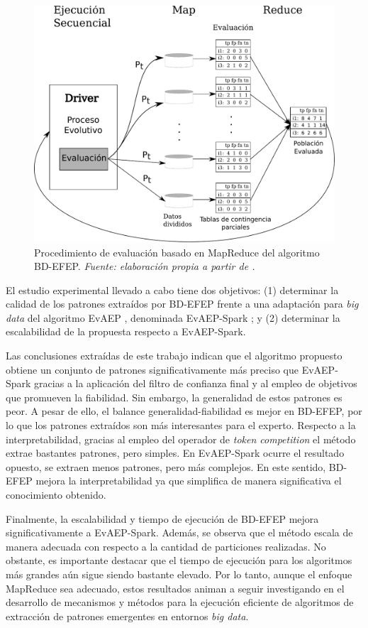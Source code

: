 \documentclass[c5paper,10pt,twoside]{book}	   	%
\begin{document}
\begin{figure}[!hbtp]
	\centering
	\includegraphics[width=0.7\linewidth]{./Figures/mapReduce_BDEFEP.pdf}
	\caption[Procedimiento de evaluación basado en MapReduce del algoritmo BD-EFEP.]{Procedimiento de evaluación basado en MapReduce del algoritmo BD-EFEP. \textit{Fuente: elaboración propia a partir de \cite{Gcgd19}.}}
	\label{fig:BDEFEP_MR}
\end{figure}

El estudio experimental llevado a cabo tiene dos objetivos: (1) determinar la calidad de los patrones extraídos por BD-EFEP frente a una adaptación para \textit{big data} del algoritmo EvAEP \cite{Gmacd16}, denominada EvAEP-Spark \cite{Ggdc17}; y (2) determinar la escalabilidad de la propuesta respecto a EvAEP-Spark.

Las conclusiones extraídas de este trabajo indican que el algoritmo propuesto obtiene un conjunto de patrones significativamente más preciso que EvAEP-Spark gracias a la aplicación del filtro de confianza final y al empleo de objetivos que promueven la fiabilidad. Sin embargo, la generalidad de estos patrones es peor. A pesar de ello, el balance generalidad-fiabilidad es mejor en BD-EFEP, por lo que los patrones extraídos son más interesantes para el experto. Respecto a la interpretabilidad, gracias al empleo del operador de \textit{token competition} el método extrae bastantes patrones, pero simples. En EvAEP-Spark ocurre el resultado opuesto, se extraen menos patrones, pero más complejos. En este sentido, BD-EFEP mejora la interpretabilidad ya que simplifica de manera significativa el conocimiento obtenido.

Finalmente, la escalabilidad y tiempo de ejecución de BD-EFEP mejora significativamente a EvAEP-Spark. Además, se observa que el método escala de manera adecuada con respecto a la cantidad de particiones realizadas. No obstante, es importante destacar que el tiempo de ejecución para los algoritmos más grandes aún sigue siendo bastante elevado. Por lo tanto, aunque el enfoque MapReduce sea adecuado, estos resultados animan a seguir investigando en el desarrollo de mecanismos y métodos para la ejecución eficiente de algoritmos de extracción de patrones emergentes en entornos \textit{big data}.
\end{document}

